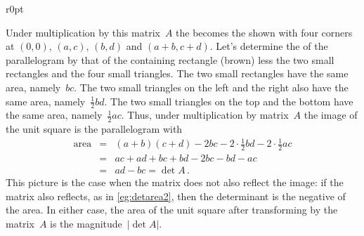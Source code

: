 \begin{wrapfigure}{r}{0pt} 
\end{wrapfigure}
Under multiplication by this matrix~\(A\) the  becomes the  shown with four corners at \((0,0)\), \((a,c)\), \((b,d)\) and \((a+b,c+d)\).
Let's determine the  of the parallelogram by that of the containing rectangle (brown) less the two small rectangles and the four small triangles.
The two small rectangles have the same area, namely~\(bc\).
The two small triangles on the left and the right also have the same area, namely~\(\frac12bd\).
The two small triangles on the top and the bottom have the same area, namely~\(\frac12ac\).
Thus, under multiplication by matrix~\(A\) the image of the unit square is the parallelogram with 
\begin{eqnarray*}
\text{area}&=&(a+b)(c+d)-2bc-2\cdot\frac12bd-2\cdot\frac12ac
\\&=&ac+ad+bc+bd-2bc-bd-ac
\\&=&ad-bc=\det A\,.
\end{eqnarray*}
This picture is the case when the matrix does not also reflect the image:  if the matrix also reflects, as in \autoref{eg:detarea2}, then the determinant is the negative of the area.
In either case, the area of the unit square after transforming by the matrix~\(A\) is the magnitude~\(|\det A|\).


